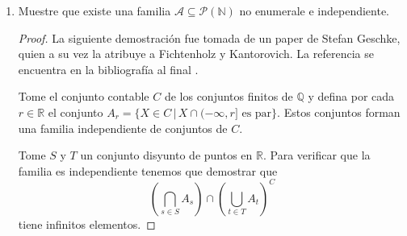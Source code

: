 \documentclass[letter,twoside,12pt]{article}
\begin{document}
\begin{enumerate}
\begin{proof}
Ahora si tomamos $ T $ una cadena de elementos en $ P $ entonces tenemos que $M = \bigcup_{F \in T} F $ es una cota superior de esta cadena. En primer lugar, como el vacío no se encuentra en ninguno de los elementos de la cadena, no se encuentra en la unión. Por otra parte si $ A, B \in M $ entonces existe $ F_1 $ y $ F_2  \in T$ tales que $ A \in F_1 $ y $ B \in F_2 $ si suponemos sin pérdida de generalidad que $ F_1 \subseteq F_2 $ entonces $ A \in F_2 $. Por lo tanto como $ F_2 $ es un filtro tenemos que $ A \cap B \in F_2 \subseteq M$. Además si $C$ es tal que para algún elemento $ A \in M $ $ A \subseteq C $, entonces como $ A \in F $ para algún $ F \in T $ tenemos que $ C \in T $ por lo que $ C \in M $. Por lo tanto es un filtro. Además contiene  a $ \mathcal{S}_X $ porque todos los filtros de $ T $ lo contienen.

Luego por el Lema de Zorn existe un filtro máximal $ \mathcal{U} $ que contiene a $ \mathcal{S}_X $ y por el Teorema 3 este filtro es un ultrafiltro.

Para probar que la función que envia cada $ X $ a su respectivo $ \mathcal{U}_X $ es inyectiva tomese $ X, Y \subseteq \mathcal{A} $, tales que $ X \not = Y $ y supongamos sin pérdida de generalidad que existe $ A \in X $ tal que $ A \not \in Y $. Luego $ A \in \mathcal{S}_X \subseteq \mathcal{U}_X $, mientras que $ A^C \in \mathcal{S}_Y \subseteq \mathcal{U}_Y $. Por lo tanto $  \mathcal{U}_X $ y $ \mathcal{U}_Y $ deben ser diferentes. De lo contrario $ A $ y $ A^C \in \mathcal{U}_X $, por lo que $ A \cap A^C = \emptyset \in \mathcal{U}_X $, lo que contradeciría el hecho que $ \mathcal{U}_X $ es un ultrafiltro.

\end{proof}

\item Muestre que existe una familia $ \mathcal{A} \subseteq \mathcal{P}(\mathbb{N}) $ no enumerale e independiente. 
\begin{proof}
La siguiente demostración fue tomada de un paper de Stefan Geschke, quien a su vez la atribuye a Fichtenholz y Kantorovich. La referencia se encuentra en la bibliografía al final \cite{stefan}.

Tome el conjunto contable $ C $ de los conjuntos finitos de $ \mathbb{Q} $ y defina por cada $ r \in \mathbb{R} $ el conjunto $ A_r = \{X \in C \,|\, X \cap (-\infty,r] \text{ es par}\} $. Estos conjuntos forman una familia independiente de conjuntos de $ C $.

Tome $ S $ y $ T $ un conjunto disyunto de puntos en $ \mathbb{R} $. Para verificar que la familia es independiente tenemos que demostrar que 
\begin{equation}
(\bigcap_{s \in S} A_s) \cap (\bigcup_{t \in T}A_t)^C \nonumber
\end{equation}
tiene infinitos elementos.


\end{proof}
\end{enumerate}
\end{document}
